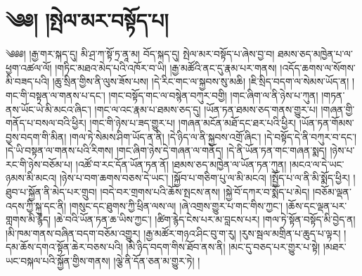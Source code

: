 \setcounter{footnote}{0} 
\chapter{༄༅། །སྤེལ་མར་བསྟོད་པ།}༄༅༅། །རྒྱ་གར་སྐད་དུ། མི་ཤྲ་ཀ་སྟོ་ཏྲ་ནཱ་མ། བོད་སྐད་དུ། སྤེལ་མར་བསྟོད་པ་ཞེས་བྱ་བ། ཐམས་ཅད་མཁྱེན་པ་ལ་ཕྱག་འཚལ་ལོ། །གཏིང་མཐའ་མེད་པའི་འཁོར་བ་ཡི། །རྒྱ་མཚོའི་ནང་དུ་རྣམ་པར་གནས། །འདོད་ཆགས་ལ་སོགས་མི་བཟད་པའི། །ཆུ་སྲིན་གྱིས་ནི་ལུས་ཟོས་པས། །དེ་རིང་གང་ལ་སྐྱབས་སུ་མཆི། །ཇི་སྲིད་བདག་ལ་སེམས་ཡོད་ན། །གང་གི་བསྟན་ལ་གནས་པ་དང་། །གང་བསྟོད་གང་ལ་བསྙེན་བཀུར་བགྱི། །གང་ཞིག་ལ་ནི་ཉེས་པ་ཀུན། །གཏན་ནས་ཡོང་ཡེ་མི་མངའ་ཞིང་། །གང་ལ་འང་རྣམ་པ་ཐམས་ཅད་དུ། །ཡོན་ཏན་ཐམས་ཅད་གནས་གྱུར་པ། །གཞན་གྱི་གནོད་པ་བསལ་བའི་ཕྱིར། །གང་གི་ཉེས་པ་ཟད་གྱུར་པ། །གཞན་མངོན་མཐོ་དང་ཐར་པའི་ཕྱིར། །ཡོན་ཏན་གོམས་བྱས་བདག་གི་མིན། །གལ་ཏེ་སེམས་ཤིག་ཡོད་ན་ནི། །དེ་ཉིད་ལ་ནི་སྐྱབས་འགྲོ་ཞིང་། །དེ་བསྟོད་དེ་ནི་བཀུར་བ་དང་། །དེ་ཡི་བསྟན་ལ་གནས་པའི་རིགས། །གང་ཞིག་ཉེས་དེ་གཞན་ལ་གནོད། །དེ་ནི་ཡོན་ཏན་གང་གཞན་སྨད། །ཉེས་པ་རང་གི་ཉེས་བཅོམ་པ། །འཚོ་བ་རང་དོན་ཡོན་ཏན་ནོ། །ཐམས་ཅད་མཁྱེན་ལ་ཡོན་ཏན་ཀུན། །མངའ་ལ་དེ་ཡང་ཉམས་མི་མངའ། །ཉེས་པ་བག་ཆགས་བཅས་དེ་ཡང་། །སྐྱོབ་པ་གཅིག་པུ་ལ་མི་མངའ། །སྤྱོད་པ་ལ་ནི་མི་སྨོད་ཕྱིར། །ཐུབ་པ་སྐྱོན་ནི་མེད་པར་གྲུབ། །བདེ་བར་གྲགས་པའི་ཆོས་སྤངས་ནས། །སྐྱེ་བོ་དཀར་བ་སྨོད་པ་མེད། །བཅོམ་ལྡན་འདས་ཀྱི་སྐུ་དང་ནི། །གསུང་དང་ཐུགས་ཀྱི་ཕྲིན་ལས་ལ། །ཞེ་འགྲས་གྱུར་པ་གང་གིས་ཀྱང་། །ཆོས་དང་ལྡན་པར་གླགས་མི་རྙེད། །ཆེ་བའི་ཡོན་ཏན་ཆ་ཡིས་ཀྱང་། །ཚིག་རྙེད་ངེས་པར་མ་བླངས་པར། །གལ་ཏེ་སྟོན་བསྟོད་མི་བྱེད་ན། །མི་ཁམ་གནས་བཞིན་བདག་བཅོམ་འགྱུར། །རྒྱ་མཚོར་གཉའ་ཤིང་བུ་ག་རུ། །རུས་སྦལ་མགྲིན་པ་ཆུད་པ་ལྟར། །དམ་ཆོས་དགའ་སྟོན་ཆེར་བཅས་པའི། །མི་ཉིད་བདག་གིས་ཐོབ་ནས་ནི། །མང་དུ་བཅད་པར་གྱུར་པ་སྟེ། །མཐར་ཡང་བསྐལ་པའི་སྐྱོན་གྱིས་གནས། །ལྕེ་ནི་དོན་ཅན་མ་གྱུར་ཏེ། །
